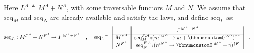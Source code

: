 Here $L^{A}\triangleq M^{A}+N^{A}$, with some traversable functors
$M$ and $N$. We assume that $\text{seq}_{M}$ and $\text{seq}_{N}$
are already available and satisfy the laws, and define $\text{seq}_{L}$
as:
\[
\text{seq}_{L}:M^{F^{A}}+N^{F^{A}}\rightarrow F^{M^{A}+N^{A}}\quad,\quad\text{seq}_{L}\triangleq\,\begin{array}{|c||c|}
 & F^{M^{A}+N^{A}}\\
\hline M^{F^{A}} & \text{seq}_{M}^{F,A}\bef(m^{:M^{A}}\rightarrow m+\bbnum 0^{:N^{A}})^{\uparrow F}\\
N^{F^{A}} & \text{seq}_{N}^{F,A}\bef(n^{:N^{A}}\rightarrow\bbnum 0^{:M^{A}}+n)^{\uparrow F}
\end{array}\quad.
\]

